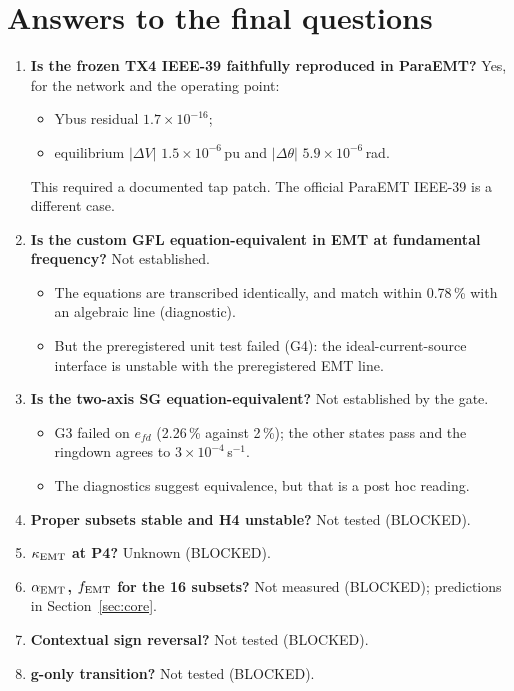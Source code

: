 \documentclass[10pt,a4paper]{article}
\newcommand{\sinv}{\,s$^{-1}$}
\begin{document}
\section*{Answers to the final questions}
\begin{enumerate}[leftmargin=1.8em]
\item \textbf{Is the frozen TX4 IEEE-39 faithfully reproduced in ParaEMT?}
  Yes, for the network and the operating point:
  \begin{itemize}
  \item Ybus residual $1.7\times10^{-16}$;
  \item equilibrium $|\Delta V|$ $1.5\times10^{-6}$\,pu and $|\Delta\theta|$
    $5.9\times10^{-6}$\,rad.
  \end{itemize}
  This required a documented tap patch. The official ParaEMT IEEE-39 is a
  different case.
\item \textbf{Is the custom GFL equation-equivalent in EMT at fundamental
  frequency?} Not established.
  \begin{itemize}
  \item The equations are transcribed identically, and match within 0.78\,\%
    with an algebraic line (diagnostic).
  \item But the preregistered unit test failed (G4): the ideal-current-source
    interface is unstable with the preregistered EMT line.
  \end{itemize}
\item \textbf{Is the two-axis SG equation-equivalent?} Not established by the
  gate.
  \begin{itemize}
  \item G3 failed on $e_{fd}$ (2.26\,\% against 2\,\%); the other states
    pass and the ringdown agrees to $3\times10^{-4}$\sinv.
  \item The diagnostics suggest equivalence, but that is a post hoc reading.
  \end{itemize}
\item \textbf{Proper subsets stable and H4 unstable?} Not tested (BLOCKED).
\item \textbf{$\kappa_{\rm EMT}$ at P4?} Unknown (BLOCKED).
\item \textbf{$\alpha_{\rm EMT}$, $f_{\rm EMT}$ for the 16 subsets?} Not
  measured (BLOCKED); predictions in Section~\ref{sec:core}.
\item \textbf{Contextual sign reversal?} Not tested (BLOCKED).
\item \textbf{g-only transition?} Not tested (BLOCKED).

\end{enumerate}
\end{document}

